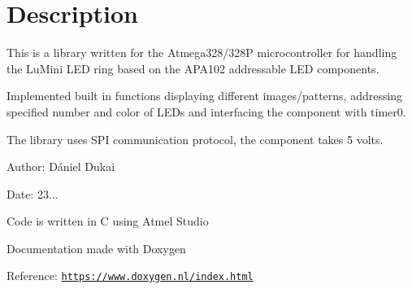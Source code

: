 \hypertarget{index_Description}{}\section{Description}\label{index_Description}
This is a library written for the Atmega328/328\-P microcontroller for handling the Lu\-Mini L\-E\-D ring based on the A\-P\-A102 addressable L\-E\-D components.

Implemented built in functions displaying different images/patterns, addressing specified number and color of L\-E\-Ds and interfacing the component with timer0.

The library uses S\-P\-I communication protocol, the component takes 5 volts.

Author\-: Dániel Dukai

Date\-: 23...

Code is written in C using Atmel Studio

Documentation made with Doxygen

Reference\-: \href{https://www.doxygen.nl/index.html}{\tt https\-://www.\-doxygen.\-nl/index.\-html} 